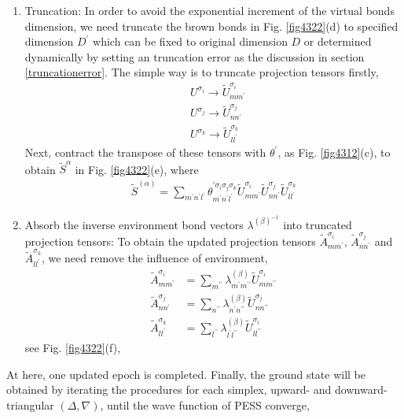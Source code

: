 \begin{enumerate}
	\item Truncation: In order to avoid the exponential increment of the virtual bonds dimension, we need truncate the brown bonds in Fig. \ref{fig4322}(d) to specified dimension $D^{\prime}$ which can be fixed to original dimension $D$ or determined dynamically by setting an truncation error as the discussion in section \ref{truncationerror}. The simple way is to truncate projection tensors firstly,  
		\begin{align}
			&U^{\sigma_i} \rightarrow \widetilde{U}^{\sigma_i}_{mm^{\prime}} \\
			&U^{\sigma_j} \rightarrow \widetilde{U}^{\sigma_j}_{nn^{\prime}} \\
			&U^{\sigma_k} \rightarrow \widetilde{U}^{\sigma_k}_{ll^{\prime}}
		\end{align}
		Next, contract the transpose of these tensors with $\theta^{\prime}$, as Fig. \ref{fig4312}(c), to obtain $\widetilde{S}^{\alpha}$ in Fig. \ref{fig4322}(e), where
		\begin{align}
			\widetilde{S}^{(\alpha)} = \sum_{m^{\prime}n^{\prime}l^{\prime}}{\theta_{m^{\prime} n^{\prime} l^{\prime}}^{\prime \sigma_i \sigma_j \sigma_k} \widetilde{U}^{\sigma_i}_{mm^{\prime}} \widetilde{U}^{\sigma_j}_{nn^{\prime}} \widetilde{U}^{\sigma_k}_{ll^{\prime}}}
		\end{align}
	\item Absorb the inverse environment bond vectors $\lambda^{(\beta)^{-1}}$ into truncated projection tensors: To obtain the updated projection tensors $\widetilde{A}^{\sigma_i}_{mm^{\prime}}$, $\widetilde{A}^{\sigma_j}_{nn^{\prime}}$ and $\widetilde{A}^{\sigma_k}_{ll^{\prime}}$, we need remove the influence of environment, 
		\begin{align}
			\widetilde{A}^{\sigma_i}_{mm^{\prime}} &= \sum_{m^{\prime \prime}}{ \lambda^{(\beta)}_{m^{\prime} m^{\prime \prime}} \widetilde{U}^{\sigma_i}_{mm^{\prime \prime}}} \\
			\widetilde{A}^{\sigma_j}_{nn^{\prime}} &= \sum_{n^{\prime \prime}}{ \lambda^{(\beta)}_{n^{\prime} n^{\prime \prime}} \widetilde{U}^{\sigma_j}_{nn^{\prime \prime}}} \\
			\widetilde{A}^{\sigma_k}_{ll^{\prime}} &= \sum_{l^{\prime \prime}}{ \lambda^{(\beta)}_{l^{\prime} l^{\prime \prime}} \widetilde{U}^{\sigma_i}_{ll^{\prime \prime}}}
		\end{align}	
		see Fig. \ref{fig4322}(f),
\end{enumerate}

At here, one updated epoch is completed. Finally, the ground state will be obtained by iterating the procedures for each simplex, upward- and downward- triangular $(\Delta, \nabla)$, until the wave function of PESS converge, 
